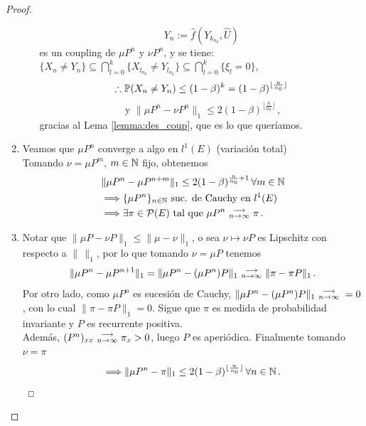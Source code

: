 \begin{proof}
\begin{enumerate}
\begin{itemize}
        $$ Y_n := \hat{f}(Y_{k_{n_0}},\hat{U})$$
        es un coupling de $\mu P^n$ y $\nu P^n$, 
        y se tiene: $\{X_n\neq Y_n\}\subseteq \displaystyle \bigcap^k_{l=0}\{X_{l_{n_0}}\neq Y_{l_{n_0}}\}\subseteq \bigcap^k_{l=0}\{\xi_l=0\}$,
        $$ \therefore \P(X_n\neq Y_n)\leq (1-\beta)^k=(1-\beta)^{\lfloor\frac{n}{n_0}\rfloor}$$
        $$ \text{ y } \|\mu P^n-\nu P^n\|_1\leq 2(1-\beta)^{\lfloor\frac{n}{n_0}\rfloor} \, ,$$
        gracias al Lema \ref{lemma:des_coup},
        que es lo que queríamos.
    \end{itemize}
    \item Veamos que $\mu P^n$ converge a algo en %
    $l^1(E)$ (variación total)
    \\ Tomando $\nu = \mu P^m$, $m\in\N$ fijo, obtenemos
    \begin{alignat*}{2}
        &  \|\mu P^n-\mu P^{n+m}\|_1\leq 2(1-\beta)^{\frac{n}{n_0}+1}\, \forall m\in\N \\
        & \Longrightarrow \{\mu P^n\}_{n\in\N}\text{ suc. de Cauchy en }l^1(E) \\
        & \Longrightarrow \exists \pi\in\mathcal{P}(E) \text{ tal que }\mu P^n\conv\pi\, .
    \end{alignat*}
    \item Notar que $\|\mu P-\nu P\|_1\leq \|\mu-\nu\|_1$, o sea $\nu\mapsto\nu P$ es Lipschitz con respecto a $\|\,\|_1$, por lo que tomando $\nu=\mu P$ tenemos
    $$ \|\mu P^n-\mu P^{n+1}\|_1=\|\mu P^n-(\mu P^n)P\|_1\conv \|\pi-\pi P\|_1 \, .$$
    Por otro lado, como $\mu P^n$ es sucesión de Cauchy, $\|\mu P^n-(\mu P^n)P\|_1\conv=0$, con lo cual $\|\pi-\pi P\|_1=0$. Sigue que $\pi$ es medida de probabilidad invariante y $P$ es recurrente positiva.
    \\ Además, $(P^n)_{xx}\conv\pi_x>0$, luego $P$ es aperiódica. Finalmente tomando $\nu=\pi$
    $$ \Longrightarrow \|\mu P^n-\pi\|_1\leq 2(1-\beta)^{\lfloor\frac{n}{n_0}\rfloor}\, \forall n\in\N\, .$$
    $\findem$
\end{enumerate}
\negro
\end{proof}
